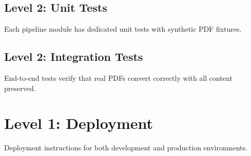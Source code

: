 \documentclass[12pt]{article}
\begin{document}
\subsection{Level 2: Unit Tests}
Each pipeline module has dedicated unit tests with synthetic PDF fixtures.

\subsection{Level 2: Integration Tests}
End-to-end tests verify that real PDFs convert correctly with all content
preserved.

\section{Level 1: Deployment}
Deployment instructions for both development and production environments.
\end{document}
